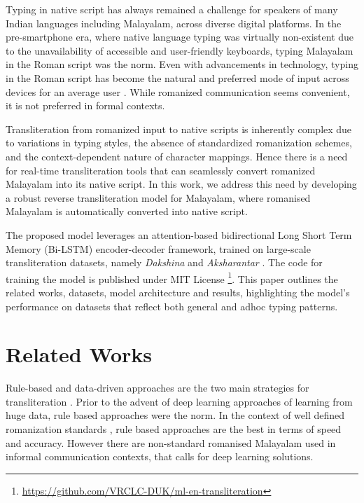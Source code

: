 \documentclass[11pt]{article}
\begin{document}
Typing in native script has always remained a challenge for speakers of many Indian languages including Malayalam, across diverse digital platforms. In the pre-smartphone era, where native language typing was virtually non-existent due to the unavailability of accessible and user-friendly keyboards, typing Malayalam in the Roman script was the norm. Even with advancements in technology, typing in the Roman script has become the natural and preferred mode of input across devices for an average user \cite{madhani-etal-2023-aksharantar}. While romanized communication seems convenient, it is not preferred in formal contexts.

Transliteration from romanized input to native scripts is inherently complex due to variations in typing styles, the absence of standardized romanization schemes, and the context-dependent nature of character mappings. Hence there is a need for real-time transliteration tools that can seamlessly convert romanized Malayalam into its native script. In this work, we address this need by developing a robust reverse transliteration model for Malayalam, where romanised Malayalam is automatically converted into native script.

The proposed model leverages an attention-based bidirectional Long Short Term Memory (Bi-LSTM) encoder-decoder framework, trained on large-scale transliteration datasets, namely \textit{Dakshina} \cite{roark-etal-2020-processing} and \textit{Aksharantar} \cite{madhani-etal-2023-aksharantar}. The code for training the model is published under MIT License \footnote{\url{https://github.com/VRCLC-DUK/ml-en-transliteration}}. This paper outlines the related works, datasets, model architecture and results, highlighting the model's performance on datasets that reflect both general and adhoc typing patterns.
\vspace{-0.2cm}
\section{Related Works}


Rule-based and data-driven approaches are the two
main strategies for transliteration \cite{kavya2022}. Prior to the advent of deep learning approaches of learning from huge data, rule based approaches were the norm. In the context of well defined romanization standards \cite{iso}, rule based approaches are the best in terms of speed and accuracy. However there are non-standard romanised Malayalam used in informal communication contexts, that calls for deep learning solutions.
\end{document}
